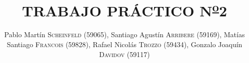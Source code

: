 \title{TRABAJO PR\'ACTICO N\textsuperscript{\underline{o}}2}
\author{ \newline Pablo Mart\'in  \textsc{Scheinfeld} (59065), \newline
Santiago Agustín \textsc{Arribere} (59169), \newline
Matías Santiago \textsc{Francois} (59828), \newline
Rafael Nicolás \textsc{Trozzo} (59434), \newline
Gonzalo Joaquín \textsc{Davidov} (59117)}

\date{\fecha}